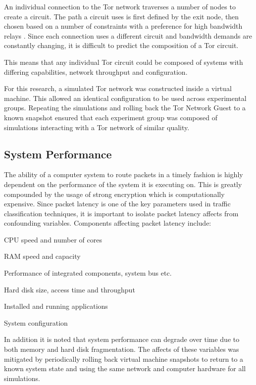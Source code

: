 \documentclass{ecuthesis}
\begin{document}
An individual connection to the Tor network traverses a number of nodes to
create a circuit. The path a circuit uses is first defined by the exit node,
then chosen based on a number of constraints with a preference for high
bandwidth relays \parencite{website:tor-path-selection}. Since each connection
uses a different circuit and bandwidth demands are constantly changing, it is
difficult to predict the composition of a Tor circuit.

This means that any individual Tor circuit could be composed of systems with
differing capabilities, network throughput and configuration.

For this research, a simulated Tor network was constructed inside a virtual
machine. This allowed an identical configuration to be used across experimental
groups. Repeating the simulations and rolling back the Tor Network Guest to a
known snapshot ensured that each experiment group was composed of simulations
interacting with a Tor network of similar quality.

\subsection{System Performance}

The ability of a computer system to route packets in a timely fashion is highly
dependent on the performance of the system it is executing on. This is greatly
compounded by the usage of strong encryption which is computationally expensive.
Since packet latency is one of the key parameters used in traffic classification
techniques, it is important to isolate packet latency affects from confounding
variables. Components affecting packet latency include:

\begin{itemize*}
  \item CPU speed and number of cores
  \item RAM speed and capacity
  \item Performance of integrated components, system bus etc.
  \item Hard disk size, access time and throughput
  \item Installed and running applications
  \item System configuration
\end{itemize*}

In addition it is noted that system performance can degrade over time due to
both memory and hard disk fragmentation. The affects of these variables was
mitigated by periodically rolling back virtual machine snapshots to return to a
known system state and using the same network and computer hardware for all
simulations.
\end{document}
